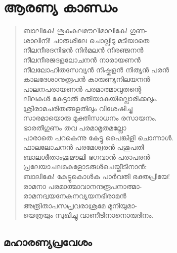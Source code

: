 \chapter{ആരണ്യ കാണ്ഡം}

\begin{verse}
ബാലികേ! ശുകകുലമൗലിമാലികേ! ഗുണ-\\
ശാലിനീ! ചാരുശീലേ ചൊല്ലീടു മടിയാതെ\\
നീലനീരദനിഭന്‍ നിര്‍മലന്‍ നിരഞ്ജനന്‍\\
നീലനീരജദളലോചനന്‍ നാരായണന്‍\\
നീലലോഹിതസേവ്യന്‍ നിഷ്കളന്‍ നിത്യന്‍ പരന്‍\\
കാലദേശാനുരൂപന്‍ കാരുണ്യനിലയനന്‍\\
പാലനപരായണന്‍ പരമാത്മാവുതന്റെ\\
ലീലകള്‍ കേട്ടാല്‍ മതിയാകയില്ലൊരിക്കലും.\\
ശ്രീരാമചരിതങ്ങളതിലും വിശേഷിച്ചു\\
സാരമായൊരു മുക്തിസാധനം രസായനം.\\
ഭാരതീഗുണം തവ പരമാമൃതമല്ലോ\\
പാരാതെ പറകെന്നു കേട്ടു പൈങ്കിളി ചൊന്നാള്‍.\\
ഫാലലോചനന്‍ പരമേശ്വരന്‍ പശുപതി\\
ബാലശീതാംശുമൗലി ഭഗവാന്‍ പരാപരന്‍\\
പ്രലേയാചലമകളോടരുള്‍ചെയ്തീടിനാന്‍:\\
ബാലികേ! കേട്ടുകൊള്‍ക പാര്‍വതി ഭക്തപ്രിയേ!\\
രാമനാ പരമാത്മാവാനന്ദരൂപനാത്മാ-\\
രാമനദ്വയനേകനവ്യയനഭിരാമന്‍\\
അത്രിതാപസപ്രവരാശ്രമേ മുനിയുമാ-\\
യെത്രയും സുഖിച്ചു വാണീടിനാനൊരുദിനം.
\end{verse}

\section{മഹാരണ്യപ്രവേശം}


